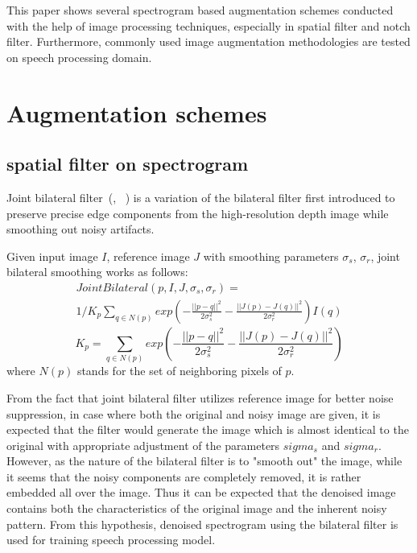 \documentclass[10pt,twocolumn,letterpaper]{article}
\begin{document}
This paper shows several spectrogram based augmentation schemes conducted with the help of image processing techniques,
especially in spatial filter and notch filter. Furthermore, commonly used image augmentation methodologies
are tested on speech processing domain.

\section{Augmentation schemes}
\subsection{spatial filter on spectrogram}
\label{sec:spatial}

Joint bilateral filter~(\cite{eisemann2004flash}, ~\cite{petschnigg2004digital}) is a variation of the 
bilateral filter first introduced to preserve precise edge components from the high-resolution depth 
image while smoothing out noisy artifacts.

Given input image $I$, reference image $J$ with smoothing parameters $\sigma_s$, $\sigma_r$,
joint bilateral smoothing works as follows:
\begin{equation}
\begin{multlined}
JointBilateral(p, I, J, \sigma_s, \sigma_r) = \\
1/K_p\sum_{q \in N(p)}exp(-\frac{||p-q||^2}{2\sigma_s^2}-\frac{||J(p)-J(q)||^2}{2\sigma_r^2})I(q)
\end{multlined}
\end{equation}
\begin{equation}
K_p = \sum_{q \in N(p)}exp(-\frac{||p-q||^2}{2\sigma_s^2}-\frac{||J(p)-J(q)||^2}{2\sigma_r^2})
\end{equation}
where $N(p)$ stands for the set of neighboring pixels of $p$.

From the fact that joint bilateral filter utilizes reference 
image for better noise suppression, in case where both the original and noisy image are given, it is expected
that the filter would generate the image which is almost identical to the original with appropriate adjustment 
of the parameters $sigma_s$ and $sigma_r$.
However, as the nature of the bilateral filter is to "smooth out" the image, 
while it seems that the noisy components are completely removed,
it is rather embedded all over the image. Thus it can be expected that the denoised image contains both the 
characteristics of the original image and the inherent noisy pattern. From this hypothesis, denoised spectrogram
using the bilateral filter is used for training speech processing model.
\end{document}
